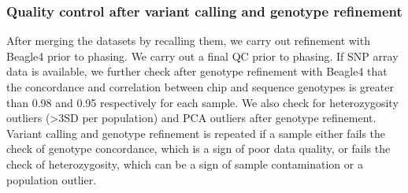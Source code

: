 \subsubsection{Quality control after variant calling and genotype refinement}
After merging the datasets by recalling them, we carry out refinement with Beagle4 prior to phasing. We carry out a final \gls{QC} prior to phasing. If \gls{SNP} array data is available, we further check after genotype refinement with Beagle4 that the concordance and correlation between chip and sequence genotypes is greater than 0.98 and 0.95 respectively for each sample. We also check for heterozygosity outliers (\textgreater3\gls{SD} per population) and PCA outliers after genotype refinement. Variant calling and genotype refinement is repeated if a sample either fails the check of genotype concordance, which is a sign of poor data quality, or fails the check of heterozygosity, which can be a sign of sample contamination or a population outlier.